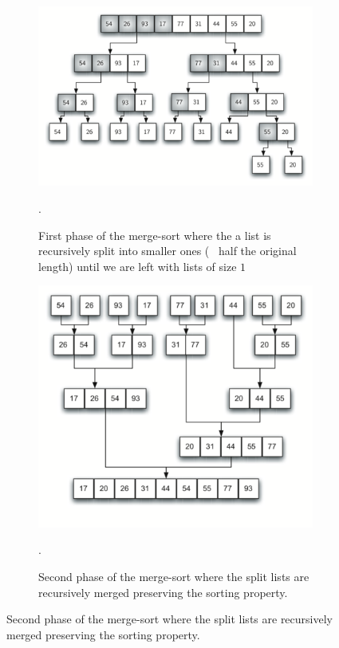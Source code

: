 \begin{figure}
    \centering
    \begin{subfigure}[t]{0.80\textwidth}
        \includegraphics[width=\textwidth]{sources/merge_k_sorted_lists/images/mergesort_example}
        \caption[]{First phase of the merge-sort where the a list is recursively split into smaller ones (~ half the original length) until we are left with lists of size $1$}.
        \label{fig:merge_k_sorted_lists:example_mergesort}
     \end{subfigure}
    \hfill
    \begin{subfigure}[t]{0.80\textwidth}
        \includegraphics[width=\textwidth]{sources/merge_k_sorted_lists/images/mergesort_example_1}
        \caption[]{Second phase of the merge-sort where the split lists are recursively merged preserving the sorting property.}.
        \label{fig:merge_k_sorted_lists:example_mergesort_1}
     \end{subfigure}
\end{figure}


